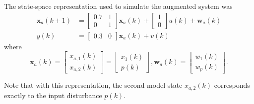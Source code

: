 The state-space representation used to simulate the augmented system was
\begin{equation} \label{eq:sim-sys-siso-ss-aug}
	\begin{split}
	\mathbf{x}_{a}(k+1) & =\left[\begin{array}{cc}
		0.7 & 1 \\
		0 & 1
	\end{array}\right] \mathbf{x}_{a}(k)+\left[\begin{array}{l}
		1 \\
		0
	\end{array}\right] u(k) + \mathbf{w}_{a}(k) \\
	y(k) & =\left[\begin{array}{cc}
	0.3 & 0
\end{array}\right] \mathbf{x}_{a}(k) + v(k)
\end{split}
\end{equation}
where
\begin{equation} \label{eq:sim-sys-siso-ss-aug2}
		\mathbf{x}_{a}(k) = \left[\begin{array}{l}
			x_{a,1}(k) \\
			x_{a,2}(k)
		\end{array}\right] = \left[\begin{array}{l}
		x_{1}(k) \\
		p(k)
	\end{array}\right], \mathbf{w}_{a}(k) = \left[\begin{array}{l}
	w_1(k) \\
	w_{p}(k)
\end{array}\right] .
\end{equation}

Note that with this representation, the second model state $x_{a,2}(k)$ corresponds exactly to the input disturbance $p(k)$.


